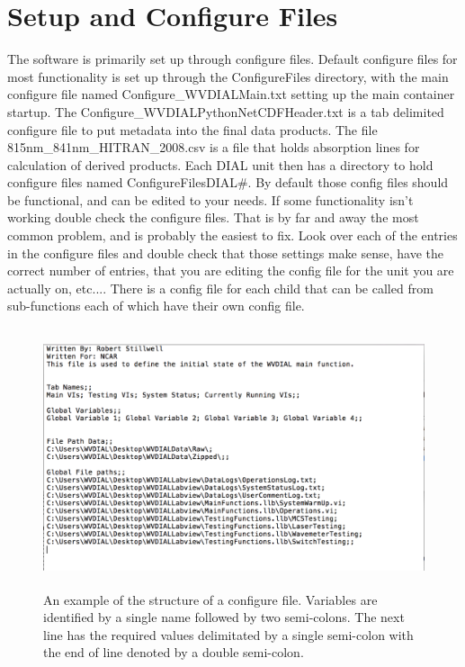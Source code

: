 
\chapter{Setup and Configure Files}
\label{CH-Config}

The software is primarily set up through configure files. Default configure files for most functionality is set up through the ConfigureFiles directory, with the main configure file named Configure\_WVDIALMain.txt setting up the main container startup. The Configure\_WVDIALPythonNetCDFHeader.txt is a tab delimited configure file to put metadata into the final data products. The file 815nm\_841nm\_HITRAN\_2008.csv is a file that holds absorption lines for calculation of derived products. Each DIAL unit then has a directory to hold configure files named ConfigureFilesDIAL\#. By default those config files should be functional, and can be edited to your needs. If some functionality isn't working double check the configure files. That is by far and away the most common problem, and is probably the easiest to fix. Look over each of the entries in the configure files and double check that those settings make sense, have the correct number of entries, that you are editing the config file for the unit you are actually on, etc.... There is a config file for each child that can be called from sub-functions each of which have their own config file. 

\begin{figure}[!ht]\centering
\includegraphics[height=3in]{Figures/ConfigureFileExample}
\caption{An example of the structure of a configure file. Variables are identified by a single name followed by two semi-colons. The next line has the required values delimitated by a single semi-colon with the end of line denoted by a double semi-colon.}\label{Fig:ConfigureFile}
\end{figure}

